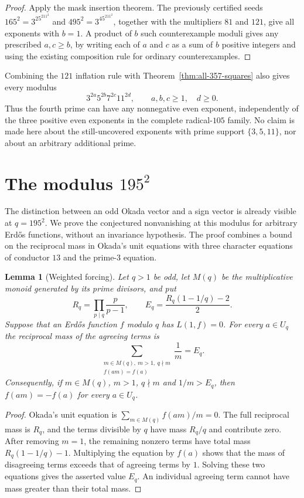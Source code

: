 \documentclass[11pt]{amsart}
\newtheorem{lemma}[theorem]{Lemma}
\theoremstyle{definition}
\theoremstyle{remark}
\numberwithin{equation}{section}
\begin{document}
\begin{proof}
Apply the mask insertion theorem. The previously certified seeds
$165^2=3^25^211^2$ and $495^2=3^45^211^2$, together with the multipliers
$81$ and $121$, give all exponents with $b=1$. A product of $b$ such
counterexample moduli gives any prescribed $a,c\ge b$, by writing each of
$a$ and $c$ as a sum of $b$ positive integers and using the existing
composition rule for ordinary counterexamples.
\end{proof}

Combining the $121$ inflation rule with
Theorem~\ref{thm:all-357-squares} also gives every modulus
\[
 3^{2a}5^{2b}7^{2c}11^{2d},
 \qquad a,b,c\ge1,\quad d\ge0.
\]
Thus the fourth prime can have any nonnegative even exponent, independently
of the three positive even exponents in the complete radical-$105$ family.
No claim is made here about the still-uncovered exponents with prime support
$\{3,5,11\}$, nor about an arbitrary additional prime.

\section{The modulus \texorpdfstring{$195^2$}{195 squared}}\label{sec:q195}

The distinction between an odd Okada vector and a sign vector is already
visible at $q=195^2$.  We prove the conjectured nonvanishing at this modulus
for arbitrary Erd\H{o}s functions, without an invariance hypothesis.
The proof combines a bound on the reciprocal mass in Okada's unit equations
with three character equations of conductor $13$ and the prime-$3$ equation.

\begin{lemma}[Weighted forcing]\label{lem:weighted-forcing}
Let $q>1$ be odd, let $M(q)$ be the multiplicative monoid generated by its
prime divisors, and put
\[
 R_q=\prod_{p\mid q}\frac{p}{p-1},\qquad
 E_q=\frac{R_q(1-1/q)-2}{2}.
\]
Suppose that an Erd\H{o}s function $f$ modulo $q$ has $L(1,f)=0$.
For every $a\in U_q$ the reciprocal mass of the agreeing terms is
\[
 \sum_{\substack{m\in M(q),\ m>1,\ q\nmid m\\ f(am)=f(a)}}\frac1m=E_q.
\]
Consequently, if $m\in M(q)$, $m>1$, $q\nmid m$ and $1/m>E_q$, then
$f(am)=-f(a)$ for every $a\in U_q$.
\end{lemma}

\begin{proof}
Okada's unit equation is
$\sum_{m\in M(q)}f(am)/m=0$.
The full reciprocal mass is $R_q$, and the terms divisible by $q$ have mass
$R_q/q$ and contribute zero.
After removing $m=1$, the remaining nonzero terms have total mass
$R_q(1-1/q)-1$.  Multiplying the equation by $f(a)$ shows that the mass of
disagreeing terms exceeds that of agreeing terms by $1$.
Solving these two equations gives the asserted value $E_q$.
An individual agreeing term cannot have mass greater than their total mass.
\end{proof}
\end{document}
